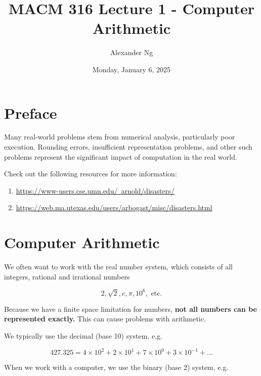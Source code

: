 \documentclass[12pt]{article}
\newcommand{\ulhref}[2]{\href{#1}{\color{blue}\uline{#2}}}
\begin{document}
\title{MACM 316 Lecture 1 - Computer Arithmetic}
\author{Alexander Ng}
\date{Monday, January 6, 2025}

\maketitle

\section{Preface}

Many real-world problems stem from numerical analysis, particularly poor 
execution. Rounding errors, insufficient representation problems, and other 
such problems represent the significant impact of computation in the real world.

Check out the following resources for more information:
\begin{enumerate}
  \item \ulhref{https://www-users.cse.umn.edu/~arnold/disasters/}{https://www-users.cse.umn.edu/~arnold/disasters/}
  \item \ulhref{https://web.ma.utexas.edu/users/arbogast/misc/disasters.html}{https://web.ma.utexas.edu/users/arbogast/misc/disasters.html}
\end{enumerate}

\section{Computer Arithmetic}

We often want to work with the real number system, which consists of all 
integers, rational and irrational numbers

\begin{equation*}
  2, \sqrt{2}, e, \pi, 10^6, \text{ etc.} 
\end{equation*}

Because we have a finite space limitation for numbers, 
\textbf{not all numbers can be represented exactly.} This can cause problems
with arithmetic.

We typically use the decimal (base 10) system, e.g.

\begin{equation*}
  427.325 = 4 \times 10^2 + 2 \times 10^1 + 7 \times 10^{0} + 3 \times 10^{-1}+\dots
\end{equation*}

When we work with a computer, we use the binary (base 2) system, e.g.
\end{document}
